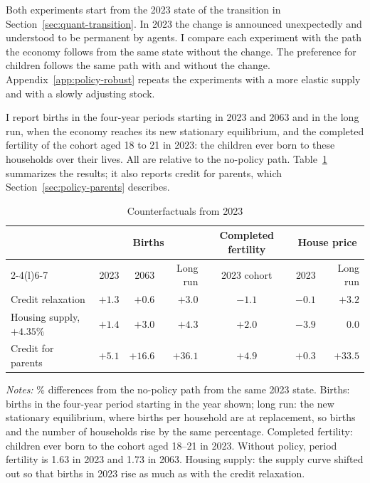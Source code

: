 Both experiments start from the 2023 state of the transition in
Section~\ref{sec:quant-transition}. In 2023 the change is announced unexpectedly and
understood to be permanent by agents. I compare each experiment with the path the economy follows from
the same state without the change. The preference for children follows the
same path with and without the change. Appendix~\ref{app:policy-robust} repeats the
experiments with a more elastic supply and with a slowly adjusting stock.

I report births in the four-year periods starting in 2023 and 2063 and in the
long run, when the economy reaches its new stationary equilibrium, and the
completed fertility of the cohort aged 18 to 21 in 2023: the children ever
born to these households over their lives. All are relative to the no-policy
path. Table~\ref{tab:policy-main} summarizes the results; it also reports
credit for parents, which Section~\ref{sec:policy-parents} describes.

\begin{table}[H]
\centering
\caption{Counterfactuals from 2023}
\label{tab:policy-main}
\small
\begin{tabularx}{\textwidth}{@{}Xrrrcrr@{}}
\toprule
 & \multicolumn{3}{c}{Births} & Completed fertility & \multicolumn{2}{c}{House price} \\
\cmidrule(lr){2-4}\cmidrule(l){6-7}
 & 2023 & 2063 & Long run & 2023 cohort & 2023 & Long run \\
\midrule
Credit relaxation & $+1.3$ & $+0.6$ & $+3.0$ & $-1.1$ & $-0.1$ & $+3.2$ \\
Housing supply, $+4.35\%$ & $+1.4$ & $+3.0$ & $+4.3$ & $+2.0$ & $-3.9$ & $0.0$ \\
Credit for parents & $+5.1$ & $+16.6$ & $+36.1$ & $+4.9$ & $+0.3$ & $+33.5$ \\
\bottomrule
\end{tabularx}
\par\smallskip
\begin{minipage}{0.95\linewidth}
\footnotesize\textit{Notes:} \% differences from the no-policy path from the
same 2023 state. Births: births in the
four-year period starting in the year shown; long run: the new stationary
equilibrium, where births per household are at replacement, so births and the
number of households rise by the same percentage. Completed fertility:
children ever born to the cohort aged 18--21 in 2023. Without policy, period
fertility is 1.63 in 2023 and 1.73 in 2063. Housing supply: the supply curve
shifted out so that births in 2023 rise as much as with the credit relaxation.
\end{minipage}
\end{table}

